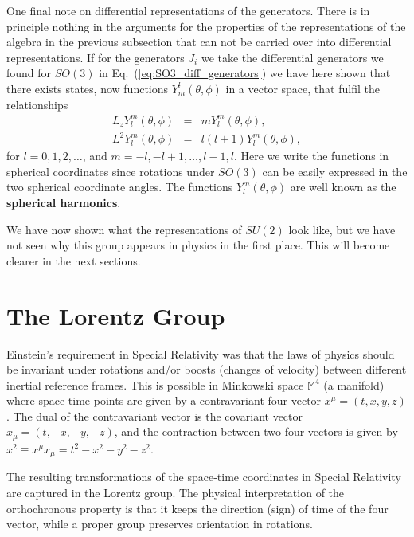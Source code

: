 \documentclass[notes.tex]{subfiles}
\begin{document}
One final note on differential representations of the generators. There is in principle nothing in the arguments for the properties of the representations of the algebra in the previous subsection that can not be carried over into differential representations. If for the generators $J_i$ we take the differential generators we found for $SO(3)$ in Eq.~(\ref{eq:SO3_diff_generators}) we have here shown that there exists states, now functions $Y_m^l(\theta,\phi)$ in a vector space,  that fulfil the relationships
\begin{eqnarray*}
L_z Y_l^m(\theta,\phi) &=& mY_l^m(\theta,\phi), \\
L^2 Y_l^m(\theta,\phi) &=& l(l+1)Y_l^m(\theta,\phi),
\end{eqnarray*}
for $l=0,1,2,\ldots$, and $m=-l,-l+1,\ldots,l-1,l$. Here we write the functions in spherical coordinates since rotations under $SO(3)$ can be easily expressed in the two spherical coordinate angles. The functions $Y_l^m(\theta,\phi)$ are well known as the {\bf spherical harmonics}.

We have now shown what the representations of $SU(2)$ look like, but we have not seen why this group appears in physics in the first place. This will become clearer in the next sections.



\section{The Lorentz Group}
\label{sec:Lorentz_group}
Einstein's requirement in Special Relativity was that the laws of physics should be invariant under rotations and/or boosts (changes of velocity) between different inertial reference frames. This is possible in Minkowski space $\mathbb{M}^4$ (a manifold) where space-time points are given by a contravariant four-vector $x^\mu = (t,x,y,z)$. The dual of the contravariant vector is the covariant vector $x_\mu = (t,-x,-y,-z)$, and the contraction between two four vectors is given by $x^2\equiv x^\mu x_\mu=t^2-x^2-y^2-z^2$.

The resulting transformations of the space-time coordinates in Special Relativity are captured in the Lorentz group.
The physical interpretation of the orthochronous property is that it keeps the direction (sign) of time of the four vector, while a proper group preserves orientation in rotations.
\end{document}
